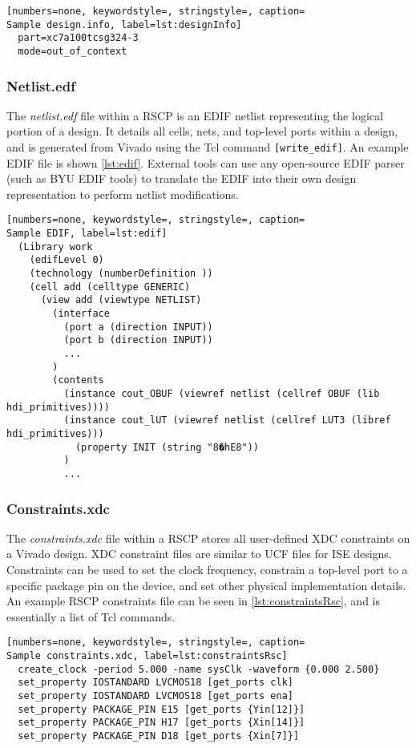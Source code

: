 \begin{lstlisting}[numbers=none, keywordstyle=, stringstyle=, caption=
Sample design.info, label=lst:designInfo]
  part=xc7a100tcsg324-3
  mode=out_of_context	
\end{lstlisting}

\subsubsection{Netlist.edf}
The \textit{netlist.edf} file within a RSCP is an EDIF netlist representing the
logical portion of a design. It details all cells, nets, and
top-level ports within a design, and is generated from Vivado using the Tcl
command \texttt{[write\_edif]}. An example EDIF file is shown
\autoref{lst:edif}. External tools can use any open-source EDIF parser (such as
BYU EDIF tools) to translate the EDIF into their own design representation to
perform netlist modifications.

\begin{lstlisting}[numbers=none, keywordstyle=, stringstyle=, caption=
Sample EDIF, label=lst:edif]
  (Library work
    (edifLevel 0)
    (technology (numberDefinition ))
    (cell add (celltype GENERIC)
      (view add (viewtype NETLIST)
        (interface
          (port a (direction INPUT))
          (port b (direction INPUT))
          ...
        )
        (contents
          (instance cout_OBUF (viewref netlist (cellref OBUF (lib hdi_primitives))))
          (instance cout_lUT (viewref netlist (cellref LUT3 (libref hdi_primitives))) 
            (property INIT (string "8�hE8"))
          )
          ...	
\end{lstlisting}

\subsubsection{Constraints.xdc}
The \textit{constraints.xdc} file within a RSCP stores all user-defined XDC
constraints on a Vivado design. XDC constraint files are similar to UCF files
for ISE designs. Constraints can be used to set the clock frequency, constrain
a top-level port to a specific package pin on the device, and set other
physical implementation details. An example RSCP constraints file can be
seen in \autoref{lst:constraintsRsc}, and is essentially a list of Tcl commands.

\begin{lstlisting}[numbers=none, keywordstyle=, stringstyle=, caption=
Sample constraints.xdc, label=lst:constraintsRsc]
  create_clock -period 5.000 -name sysClk -waveform {0.000 2.500}
  set_property IOSTANDARD LVCMOS18 [get_ports clk]
  set_property IOSTANDARD LVCMOS18 [get_ports ena]
  set_property PACKAGE_PIN E15 [get_ports {Yin[12]}]
  set_property PACKAGE_PIN H17 [get_ports {Xin[14]}]
  set_property PACKAGE_PIN D18 [get_ports {Xin[7]}]
\end{lstlisting}

